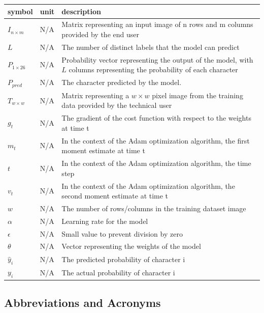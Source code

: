 \documentclass[12pt]{article}
\begin{document}
\renewcommand{\arraystretch}{1.2}
\noindent \begin{longtable*}{l l p{12cm}} \toprule
\textbf{symbol} & \textbf{unit} & \textbf{description}\\
\midrule
$I_{n \times m}$ & N/A & Matrix representing an input image of n rows
and m columns provided by the end user
\\
${L}$ & N/A & The number of distinct labels that the model can predict
\\
$P_{1 \times 26}$ & N/A & Probability vector representing the output of the
model, with ${L}$ columns representing the probability of each character
\\
$P_{pred}$ & N/A & The character predicted by the model.
\\ 
$T_{w \times w}$ & N/A & Matrix representing a ${w \times w}$ pixel image from
the training data provided by the technical user
\\
$g_t$ & N/A & The gradient of the cost function with respect to the weights at
time t
\\
$m_t$ & N/A & In the context of the Adam optimization algorithm, the first
moment estimate at time t
\\
$t$ & N/A & In the context of the Adam optimization algorithm, the time step
\\
$v_t$ & N/A & In the context of the Adam optimization algorithm, the second
moment estimate at time t
\\
$w$ & N/A & The number of rows/columns in the training dataset image
\\
$\alpha$ & N/A & Learning rate for the model
\\
$\epsilon$ & N/A & Small value to prevent division by zero
\\
$\theta$ & N/A & Vector representing the weights of the model
\\
$\hat{y}_i$ & N/A & The predicted probability of character i
\\
$y_i$ & N/A & The actual probability of character i
\\
\bottomrule
\end{longtable*}


\subsection{Abbreviations and Acronyms}
\end{document}
